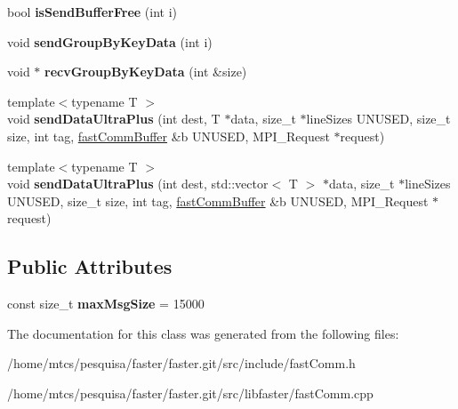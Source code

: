 \begin{DoxyCompactItemize}
bool {\bfseries is\+Send\+Buffer\+Free} (int i)
\item 
\hypertarget{classfaster_1_1fastComm_a1c1f95981846c4ef1b5aca1d44ed6fdf}{}\label{classfaster_1_1fastComm_a1c1f95981846c4ef1b5aca1d44ed6fdf} 
void {\bfseries send\+Group\+By\+Key\+Data} (int i)
\item 
\hypertarget{classfaster_1_1fastComm_a9d67334dcf7d808ab53c7e608f80778f}{}\label{classfaster_1_1fastComm_a9d67334dcf7d808ab53c7e608f80778f} 
void $\ast$ {\bfseries recv\+Group\+By\+Key\+Data} (int \&size)
\item 
\hypertarget{classfaster_1_1fastComm_a5572027981936643d12277c7e47bf54d}{}\label{classfaster_1_1fastComm_a5572027981936643d12277c7e47bf54d} 
{\footnotesize template$<$typename T $>$ }\\void {\bfseries send\+Data\+Ultra\+Plus} (int dest, T $\ast$data, size\+\_\+t $\ast$line\+Sizes U\+N\+U\+S\+ED, size\+\_\+t size, int tag, \hyperlink{classfaster_1_1fastCommBuffer}{fast\+Comm\+Buffer} \&b U\+N\+U\+S\+ED, M\+P\+I\+\_\+\+Request $\ast$request)
\item 
\hypertarget{classfaster_1_1fastComm_a2dce32a93a8a66e22d5e8caf650dd83c}{}\label{classfaster_1_1fastComm_a2dce32a93a8a66e22d5e8caf650dd83c} 
{\footnotesize template$<$typename T $>$ }\\void {\bfseries send\+Data\+Ultra\+Plus} (int dest, std\+::vector$<$ T $>$ $\ast$data, size\+\_\+t $\ast$line\+Sizes U\+N\+U\+S\+ED, size\+\_\+t size, int tag, \hyperlink{classfaster_1_1fastCommBuffer}{fast\+Comm\+Buffer} \&b U\+N\+U\+S\+ED, M\+P\+I\+\_\+\+Request $\ast$request)
\end{DoxyCompactItemize}
\subsection*{Public Attributes}
\begin{DoxyCompactItemize}
\item 
\hypertarget{classfaster_1_1fastComm_a1ed98bac8e9b75ff2706b2a3e3c6469d}{}\label{classfaster_1_1fastComm_a1ed98bac8e9b75ff2706b2a3e3c6469d} 
const size\+\_\+t {\bfseries max\+Msg\+Size} = 15000
\end{DoxyCompactItemize}


The documentation for this class was generated from the following files\+:\begin{DoxyCompactItemize}
\item 
/home/mtcs/pesquisa/faster/faster.\+git/src/include/fast\+Comm.\+h\item 
/home/mtcs/pesquisa/faster/faster.\+git/src/libfaster/fast\+Comm.\+cpp\end{DoxyCompactItemize}
